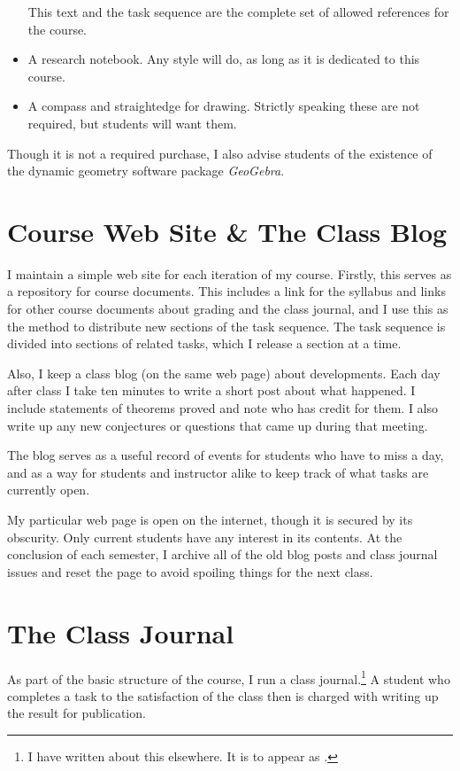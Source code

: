 \begin{annotation}
\begin{itemize}
This text and the task sequence are the complete set of allowed references for the course. 

\item A research notebook. Any style will do, as long as it is dedicated to this course.
\item A compass and straightedge for drawing. Strictly speaking these are not required, but students will want them.
\end{itemize}

Though it is not a required purchase, I also advise students of the existence of the dynamic geometry software package \emph{GeoGebra}.\cite{GGB}


\section*{Course Web Site \& The Class Blog}

I maintain a simple web site for each iteration of my course. Firstly, this serves as a repository for course documents. This includes a link for the syllabus and links for other course documents about grading and the class journal, and I use this as the method to distribute new sections of the task sequence. The task sequence is divided into sections of related tasks, which I release a section at a time.

Also, I keep a class blog (on the same web page) about developments. Each day after class I take ten minutes to write a short post about what happened. I include statements of theorems proved and note who has credit for them. I also write up any new conjectures or questions that came up during that meeting.

The blog serves as a useful record of events for students who have to miss a day, and as a way for students and instructor alike to keep track of what tasks are currently open.

My particular web page is open on the internet, though it is secured by its obscurity. Only current students have any interest in its contents. At the conclusion of each semester, I archive all of the old blog posts and class journal issues and reset the page to avoid spoiling things for the next class.


\section*{The Class Journal}

As part of the basic structure of the course, I run a class journal.\footnote{I have written about this elsewhere. It is to appear as \cite{MAANOTES}.}
A student who completes a task to the satisfaction of the class then is charged with writing up the result for publication. 


\end{annotation}

